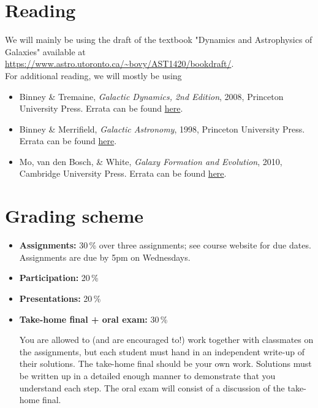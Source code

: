 \documentclass{article}
\begin{document}
\section*{Reading}

We will mainly be using the draft of the textbook "Dynamics and Astrophysics of Galaxies"
available at \url{https://www.astro.utoronto.ca/~bovy/AST1420/bookdraft/}.\\[5pt]

For additional reading, we will mostly be using

\begin{itemize}

  \item Binney \& Tremaine, \emph{Galactic Dynamics, 2nd Edition},
    2008, Princeton University Press. Errata can be found
    \href{https://www-thphys.physics.ox.ac.uk/people/JamesBinney/web/index\_files/BT2errors.pdf}{here}.

  \item Binney \& Merrifield, \emph{Galactic Astronomy},
    1998, Princeton University Press. Errata can be found
    \href{http://www-thphys.physics.ox.ac.uk/people/JamesBinney/bmerrors.pdf}{here}.

  \item Mo, van den Bosch, \& White, \emph{Galaxy Formation and Evolution},
    2010, Cambridge University Press. Errata can be found
    \href{http://people.umass.edu/hjmo/book/errata.pdf}{here}.

\end{itemize}

\section*{Grading scheme}

\begin{itemize}

    \item {\bf Assignments:} 30\,\% over three assignments; see course website for due dates. Assignments are due by 5pm on Wednesdays.

    \item {\bf Participation:} 20\,\%
  
    \item {\bf Presentations:} 20\,\%
  
    \item {\bf Take-home final + oral exam:} 30\,\%
  
  You are allowed to (and are encouraged to!) work together with
  classmates on the assignments, but each student must hand in an
  independent write-up of their solutions. The take-home final should be
  your own work. Solutions must be written up in a detailed enough
  manner to demonstrate that you understand each step. The oral exam
  will consist of a discussion of the take-home final. 

\end{itemize}
\end{document}
